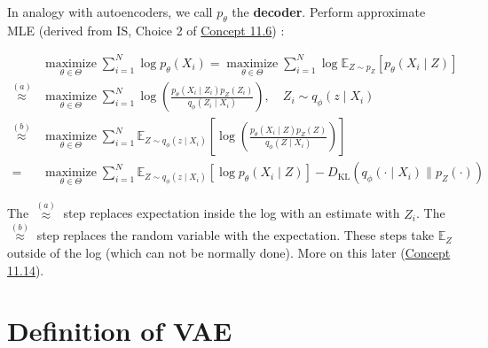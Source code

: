 \documentclass{report}
\begin{document}
\begin{concept}
    In analogy with autoencoders, we call $p_{\theta}$ the \textbf{decoder}.
    Perform approximate MLE (derived from IS, Choice 2 of \hyperref[concept:11.6]{Concept 11.6}) :

    $$
    \begin{aligned}
    & \underset{\theta \in \Theta}{\operatorname{maximize}} \sum_{i=1}^{N} \log p_{\theta}\left(X_{i}\right)=\underset{\theta \in \Theta}{\operatorname{maximize}} \sum_{i=1}^{N} \log \mathbb{E}_{Z \sim p_{Z}}\left[p_{\theta}\left(X_{i} \mid Z\right)\right] \\
    \stackrel{(a)}{\approx} & \underset{\theta \in \Theta}{\operatorname{maximize}} \sum_{i=1}^{N} \log \left(\frac{p_{\theta}\left(X_{i} \mid Z_{i}\right) p_{Z}\left(Z_{i}\right)}{q_{\phi}\left(Z_{i} \mid X_{i}\right)}\right), \quad Z_{i} \sim q_{\phi}\left(z \mid X_{i}\right) \\
    \stackrel{(b)}{\approx} & \underset{\theta \in \Theta}{\operatorname{maximize}} \sum_{i=1}^{N} \mathbb{E}_{Z \sim q_{\phi}\left(z \mid X_{i}\right)}\left[\log \left(\frac{p_{\theta}\left(X_{i} \mid Z\right) p_{Z}(Z)}{q_{\phi}\left(Z \mid X_{i}\right)}\right)\right] \\
    = & \underset{\theta \in \Theta}{\operatorname{maximize}} \sum_{i=1}^{N} \mathbb{E}_{Z \sim q_{\phi}\left(z \mid X_{i}\right)}\left[\log p_{\theta}\left(X_{i} \mid Z\right)\right]-D_{\mathrm{KL}}\left(q_{\phi}\left(\cdot \mid X_{i}\right) \| p_{Z}(\cdot)\right)
    \end{aligned}
    $$

    The $\stackrel{(a)}{\approx}$ step replaces expectation inside the log with an estimate with $Z_{i}$.
    The $\stackrel{(b)}{\approx}$ step replaces the random variable with the expectation.
    These steps take $\mathbb{E}_{Z}$ outside of the log (which can not be normally done).
    More on this later (\hyperref[concept:11.14]{Concept 11.14}).
\end{concept}

\section{Definition of VAE}
\end{document}
